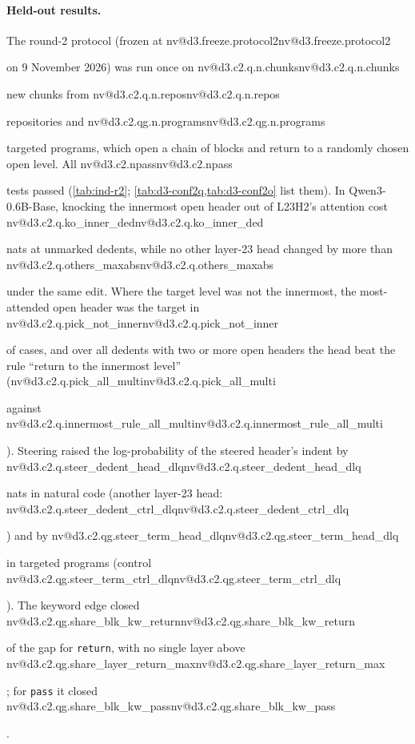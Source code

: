 \documentclass[11pt]{article}
\makeatletter
\newcommand{\nv}[1]{\ifcsname nv@#1\endcsname\csname nv@#1\endcsname\else\PackageError{numbers}{Unknown number key #1}{}\fi}
\newcommand{\hd}[2]{L#1H#2}
\newcommand{\code}[1]{\texttt{#1}}
\newcommand{\qsix}{Qwen3-0.6B-Base}
\makeatother
\begin{document}
\paragraph{Held-out results.} The round-2 protocol (frozen at \nv{d3.freeze.protocol2} on 9 November 2026) was run once on \nv{d3.c2.q.n.chunks} new chunks from \nv{d3.c2.q.n.repos} repositories and \nv{d3.c2.qg.n.programs} targeted programs, which open a chain of blocks and return to a randomly chosen open level. All \nv{d3.c2.npass} tests passed (\cref{tab:ind-r2}; \cref{tab:d3-conf2q,tab:d3-conf2o} list them). In \qsix{}, knocking the innermost open header out of \hd{23}{2}'s attention cost \nv{d3.c2.q.ko_inner_ded} nats at unmarked dedents, while no other layer-23 head changed by more than \nv{d3.c2.q.others_maxabs} under the same edit. Where the target level was not the innermost, the most-attended open header was the target in \nv{d3.c2.q.pick_not_inner} of cases, and over all dedents with two or more open headers the head beat the rule ``return to the innermost level'' (\nv{d3.c2.q.pick_all_multi} against \nv{d3.c2.q.innermost_rule_all_multi}). Steering raised the log-probability of the steered header's indent by \nv{d3.c2.q.steer_dedent_head_dlq} nats in natural code (another layer-23 head: \nv{d3.c2.q.steer_dedent_ctrl_dlq}) and by \nv{d3.c2.qg.steer_term_head_dlq} in targeted programs (control \nv{d3.c2.qg.steer_term_ctrl_dlq}). The keyword edge closed \nv{d3.c2.qg.share_blk_kw_return} of the gap for \code{return}, with no single layer above \nv{d3.c2.qg.share_layer_return_max}; for \code{pass} it closed \nv{d3.c2.qg.share_blk_kw_pass}.
\end{document}
